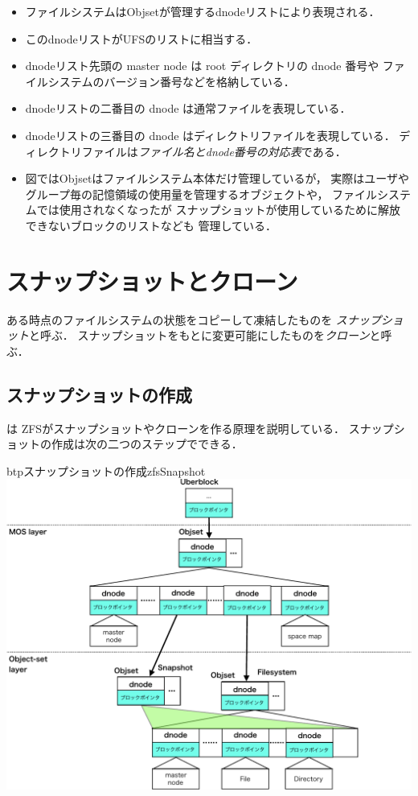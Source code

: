\begin{itemize}
\item ファイルシステムはObjsetが管理するdnodeリストにより表現される．
\item このdnodeリストがUFSの{\inode}リストに相当する．
\item dnodeリスト先頭の master node は root ディレクトリの dnode 番号や
  ファイルシステムのバージョン番号などを格納している．
\item dnodeリストの二番目の dnode は通常ファイルを表現している．
\item dnodeリストの三番目の dnode はディレクトリファイルを表現している．
  ディレクトリファイルは\emph{ファイル名とdnode番号の対応表}である．
\item 図ではObjsetはファイルシステム本体だけ管理しているが，
  実際はユーザやグループ毎の記憶領域の使用量を管理するオブジェクトや，
  ファイルシステムでは使用されなくなったが
  スナップショットが使用しているために解放できないブロックのリストなども
  管理している．
\end{itemize}

\section{スナップショットとクローン}
ある時点のファイルシステムの状態をコピーして凍結したものを
\emph{スナップショット}と呼ぶ．
スナップショットをもとに変更可能にしたものを\emph{クローン}と呼ぶ．

\subsection{スナップショットの作成}
は
ZFSがスナップショットやクローンを作る原理を説明している．
スナップショットの作成は次の二つのステップでできる．

\begin{myfig}{btp}{スナップショットの作成}{zfsSnapshot}
  \centering\includegraphics[scale=0.7]{Fig/zfsSnapshot-crop.pdf}
\end{myfig}

